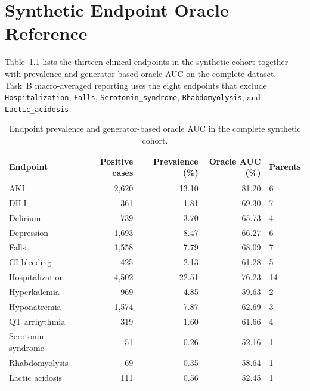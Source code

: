 \chapter{Synthetic Endpoint Oracle Reference}
\label{app:taskb-endpoints}

Table~\ref{tab:app_endpoints} lists the thirteen clinical endpoints in the synthetic cohort together with prevalence and generator-based oracle AUC on the complete dataset.
Task~B macro-averaged reporting uses the eight endpoints that exclude \texttt{Hospitalization}, \texttt{Falls}, \texttt{Serotonin\_syndrome}, \texttt{Rhabdomyolysis}, and \texttt{Lactic\_acidosis}.

\begin{table}[htbp]
\centering
\small
\caption{Endpoint prevalence and generator-based oracle AUC in the complete synthetic cohort.}
\label{tab:app_endpoints}
\begin{tabular}{lrrrl}
\toprule
Endpoint & Positive cases & Prevalence (\%) & Oracle AUC (\%) & Parents \\
\midrule
AKI & 2{,}620 & 13.10 & 81.20 & 6 \\
DILI & 361 & 1.81 & 69.30 & 7 \\
Delirium & 739 & 3.70 & 65.73 & 4 \\
Depression & 1{,}693 & 8.47 & 66.27 & 6 \\
Falls & 1{,}558 & 7.79 & 68.09 & 7 \\
GI bleeding & 425 & 2.13 & 61.28 & 5 \\
Hospitalization & 4{,}502 & 22.51 & 76.23 & 14 \\
Hyperkalemia & 969 & 4.85 & 59.63 & 2 \\
Hyponatremia & 1{,}574 & 7.87 & 62.69 & 3 \\
QT arrhythmia & 319 & 1.60 & 61.66 & 4 \\
Serotonin syndrome & 51 & 0.26 & 52.16 & 1 \\
Rhabdomyolysis & 69 & 0.35 & 58.64 & 1 \\
Lactic acidosis & 111 & 0.56 & 52.45 & 1 \\
\bottomrule
\end{tabular}
\end{table}
